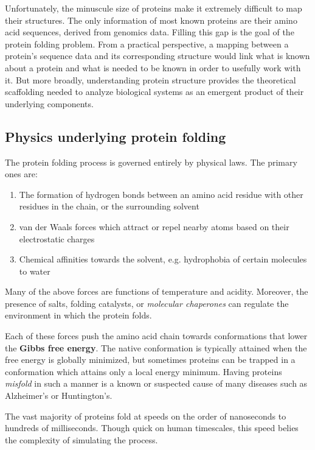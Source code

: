 \documentclass{article}
\begin{document}
Unfortunately, the minuscule size of proteins make it extremely difficult to map their structures. The only information of most known proteins are their amino acid sequences, derived from genomics data. Filling this gap is the goal of the protein folding problem. From a practical perspective, a mapping between a protein's sequence data and its corresponding structure would link what is known about a protein and what is needed to be known in order to usefully work with it. But more broadly, understanding protein structure provides the theoretical scaffolding needed to analyze biological systems as an emergent product of their underlying components.

\subsection{Physics underlying protein folding}
The protein folding process is governed entirely by physical laws. The primary ones are:

\begin{enumerate}
    \item The formation of hydrogen bonds between an amino acid residue with other residues in the chain, or the surrounding solvent
    \item van der Waals forces which attract or repel nearby atoms based on their electrostatic charges
    \item Chemical affinities towards the solvent, e.g. hydrophobia of certain molecules to water
\end{enumerate}

Many of the above forces are functions of temperature and acidity. Moreover, the presence of salts, folding catalysts, or \textit{molecular chaperones} can regulate the environment in which the protein folds.

Each of these forces push the amino acid chain towards conformations that lower the \textbf{Gibbs free energy}. The native conformation is typically attained when the free energy is globally minimized, but sometimes proteins can be trapped in a conformation which attains only a local energy minimum. Having proteins \textit{misfold} in such a manner is a known or suspected cause of many diseases such as Alzheimer's or Huntington's.

The vast majority of proteins fold at speeds on the order of nanoseconds to hundreds of milliseconds. Though quick on human timescales, this speed belies the complexity of simulating the process.
\end{document}
